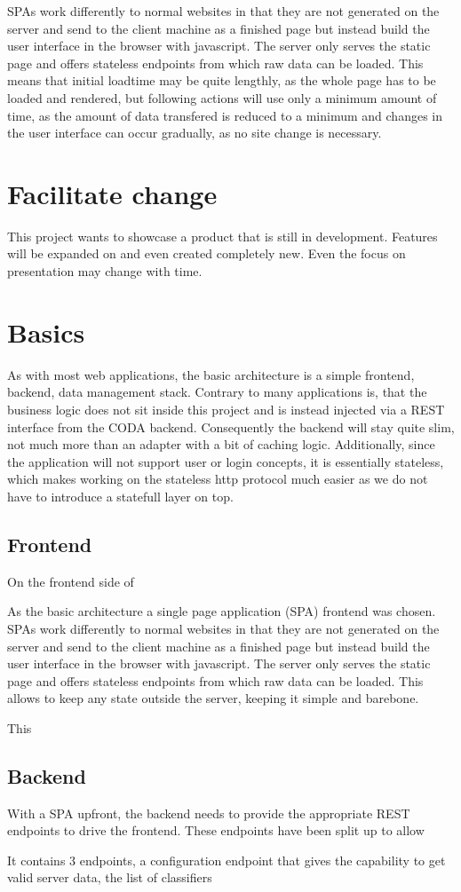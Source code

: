 SPAs work differently to normal websites in that they are not generated on the server and send to the client machine as a finished page but instead build the user interface in the browser with javascript. The server only serves the static page and offers stateless endpoints from which raw data can be loaded. This means that initial loadtime may be quite lengthly, as the whole page has to be loaded and rendered, but following actions will use only a minimum amount of time, as the amount of data transfered is reduced to a minimum and changes in the user interface can occur gradually, as no site change is necessary.

\section{Facilitate change}

This project wants to showcase a product that is still in development. Features will be expanded on and even created completely new. Even the focus on presentation may change with time. 



\section{Basics}
As with most web applications, the basic architecture is a simple frontend, backend, data management stack. Contrary to many applications is, that the business logic does not sit inside this project and is instead injected via a REST interface from the CODA backend. Consequently the backend will stay quite slim, not much more than an adapter with a bit of caching logic. Additionally, since the application will not support user or login concepts, it is essentially stateless, which makes working on the stateless http protocol much easier as we do not have to introduce a statefull layer on top.

\subsection{Frontend}
On the frontend side of

As the basic architecture a single page application (SPA) frontend was chosen. SPAs work differently to normal websites in that they are not generated on the server and send to the client machine as a finished page but instead build the user interface in the browser with javascript. The server only serves the static page and offers stateless endpoints from which raw data can be loaded. This allows to keep any state outside the server, keeping it simple and barebone. 

This 

\subsection{Backend}


With a SPA upfront, the backend needs to provide the appropriate REST endpoints to drive the frontend. These endpoints have been split up to allow 

It contains 3 endpoints, a configuration endpoint that gives the capability to get valid server data, the list of classifiers